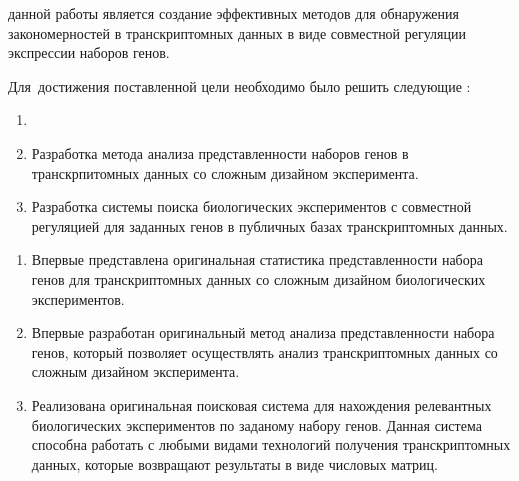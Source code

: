 

{\aim} данной работы является создание эффективных методов для обнаружения закономерностей в транскриптомных данных в виде совместной регуляции экспрессии наборов генов.

Для~достижения поставленной цели необходимо было решить следующие {\tasks}:
\begin{enumerate}[beginpenalty=10000] %
  \item {}
  \item Разработка метода анализа представленности наборов генов в транскрпитомных данных со сложным дизайном эксперимента.
  \item Разработка системы поиска биологических экспериментов с совместной регуляцией для заданных генов в публичных базах транскриптомных данных.
\end{enumerate}


{\novelty}
\begin{enumerate}[beginpenalty=10000] %
  \item Впервые представлена оригинальная статистика представленности набора генов для транскриптомных данных со сложным дизайном биологических экспериментов.
  \item Впервые разработан оригинальный метод анализа представленности набора генов, который позволяет осуществлять анализ транскриптомных данных со сложным дизайном эксперимента. 
  \item Реализована оригинальная поисковая система для нахождения релевантных биологических экспериментов по заданому набору генов. Данная система способна работать с любыми видами технологий получения транскриптомных данных, которые возвращают результаты в виде числовых матриц.
\end{enumerate}


